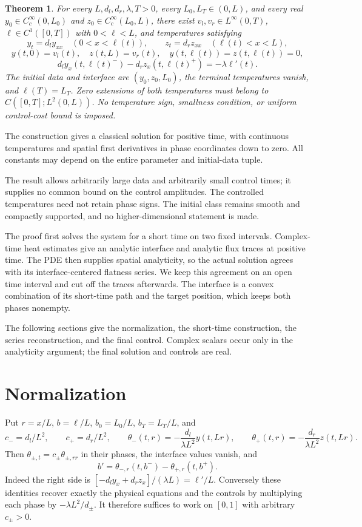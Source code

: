\documentclass[11pt]{article}
\newtheorem{theorem}{Theorem}
\begin{document}
\begin{theorem}\label{thm:control}
For every $L,d_l,d_r,\lambda,T>0$, every $L_0,L_T\in(0,L)$,
and every real $y_0\in C_c^\infty(0,L_0)$ and
$z_0\in C_c^\infty(L_0,L)$, there exist $v_l,v_r\in L^\infty(0,T)$,
$\ell\in C^1([0,T])$ with $0<\ell<L$, and temperatures satisfying
\[
 y_t=d_l y_{xx}\quad(0<x<\ell(t)),\qquad
 z_t=d_r z_{xx}\quad(\ell(t)<x<L),
\]
\[
 y(t,0)=v_l(t),\quad z(t,L)=v_r(t),\quad
 y(t,\ell(t))=z(t,\ell(t))=0,
\]
\[
 d_l y_x(t,\ell(t)^-)-d_r z_x(t,\ell(t)^+)=-\lambda\ell'(t).
\]
The initial data and interface are $(y_0,z_0,L_0)$, the terminal
temperatures vanish, and $\ell(T)=L_T$. Zero extensions of both
temperatures must belong to $C([0,T];L^2(0,L))$. No temperature sign,
smallness condition, or uniform control-cost bound is imposed.
\end{theorem}

The construction gives a classical solution for positive time, with continuous
temperatures and spatial first derivatives in phase coordinates down to zero.
All constants may depend on the entire parameter and initial-data tuple.


The result allows arbitrarily large data and arbitrarily small control
times; it supplies no common bound on the control amplitudes. The controlled
temperatures need not retain phase signs. The initial class remains smooth
and compactly supported, and no higher-dimensional statement is made.

The proof first solves the system for a short time on two fixed intervals.
Complex-time heat estimates give an analytic interface and analytic flux
traces at positive time. The PDE then supplies spatial analyticity, so the
actual solution agrees with its interface-centered flatness series. We
keep this agreement on an open time interval and cut off the traces
afterwards. The interface is a convex combination of its short-time path
and the target position, which keeps both phases nonempty.

The following sections give the normalization, the short-time construction,
the series reconstruction, and the final control. Complex scalars occur only
in the analyticity argument; the final solution and controls are real.

\section{Normalization}
Put $r=x/L$, $b=\ell/L$, $b_0=L_0/L$, $b_T=L_T/L$, and
\[
 c_-=d_l/L^2,\qquad c_+=d_r/L^2,
 \qquad \theta_-(t,r)=-\frac{d_l}{\lambda L^2}y(t,Lr),\qquad
 \theta_+(t,r)=-\frac{d_r}{\lambda L^2}z(t,Lr).
\]
Then $\theta_{\pm,t}=c_\pm\theta_{\pm,rr}$ in their phases,
the interface values vanish, and
\[
 b'=\theta_{-,r}(t,b^-)-\theta_{+,r}(t,b^+). \tag{1}
\]
Indeed the right side is
$[-d_l y_x+d_r z_x]/(\lambda L)=\ell'/L$.
Conversely these identities recover exactly the physical equations and
the controls by multiplying each phase by $-\lambda L^2/d_\pm$.
It therefore suffices to work on $[0,1]$ with arbitrary $c_\pm>0$.
\end{document}
